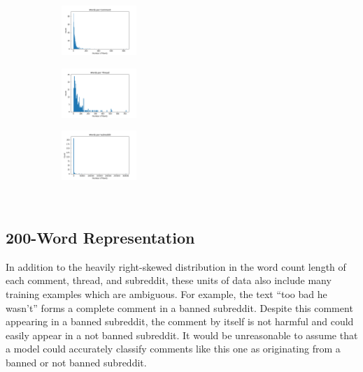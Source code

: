 \documentclass[11pt]{article}[twocolumn]
\begin{document}
\begin{figure}[H]
    \caption{Distributions of Words per Unit of Text: Comments, Threads, and Subreddits}
    \centering
    \begin{subfigure}{\textwidth}
        \centering
        \includegraphics[width=0.31\textwidth]{comment_word_dist.png}
    \end{subfigure}
    \begin{subfigure}{\textwidth}
        \centering
        \includegraphics[width=0.31\textwidth]{thread_word_dist.png}
    \end{subfigure} 
    \begin{subfigure}{\textwidth}
        \centering
        \includegraphics[width=0.31\textwidth]{subreddit_word_dist.png}
    \end{subfigure} \\
    \label{fig:words_per_unit_of_data}
\end{figure}

\subsection{200-Word Representation}
\label{sect:200WordModel}

In addition to the heavily right-skewed distribution in the word count length of each comment, thread, and subreddit, these units of data also include many training examples which are ambiguous. For example, the text ``too bad he wasn't'' forms a complete comment in a banned subreddit. Despite this comment appearing in a banned subreddit, the comment by itself is not harmful and could easily appear in a not banned subreddit. It would be unreasonable to assume that a model could accurately classify comments like this one as originating from a banned or not banned subreddit.
\end{document}
